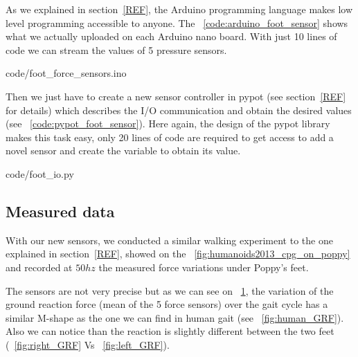 As we explained in section~\ref{REF}, the Arduino programming language makes low level programming accessible to anyone. The \codename~\ref{code:arduino_foot_sensor} shows what we actually uploaded on each Arduino nano board. With just 10 lines of code we can stream the values of 5 pressure sensors.


    {code/foot_force_sensors.ino}

Then we just have to create a new sensor controller in pypot (see section~\ref{REF} for details) which describes the I/O communication and obtain the desired values (see \codename~\ref{code:pypot_foot_sensor}). Here again, the design of the pypot library makes this task easy, only 20 lines of code are required to get access to add a novel sensor and create the variable to obtain its value.


    {code/foot_io.py}


\subsection{Measured data} %
With our new sensors, we conducted a similar walking experiment to the one explained in section~\ref{REF}, showed on the \figurename~\ref{fig:humanoids2013_cpg_on_poppy} and recorded at $50hz$ the measured force variations under Poppy's feet.

The sensors are not very precise but as we can see on \figurename~\ref{fig:poppy_GRF}, the variation of the ground reaction force (mean of the 5 force sensors) over the gait cycle has a similar M-shape as the one we can find in human gait (see \figurename~\ref{fig:human_GRF}). Also we can notice than the reaction is slightly different between the two feet (\figurename~\ref{fig:right_GRF} Vs \figurename~\ref{fig:left_GRF}).

\begin{figure}[!h]
\centering
    \hfil
    \caption{}
    \label{fig:poppy_GRF}
\end{figure}


